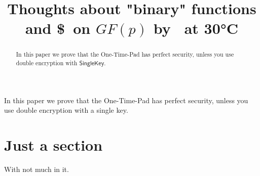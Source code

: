 \documentclass{iacrcc}
\title[running={Thoughts on binary functions},
  subtitle={A story about \niceguy is here},
  plaintext={Thoughts about "binary" functions and \$\ on $GF(p)$ by Fester Bestertester at 30°C}]{%
  Thoughts about "binary" functions and \$\ on $GF(p)$ by \niceguy\ at 30°C}
\begin{document}
\maketitle

\begin{abstract}
  In this paper we prove that the One-Time-Pad has perfect security, unless you use
  double encryption with {$\mathsf{SingleKey}$}.

\end{abstract}
\begin{textabstract}
In this paper we prove that the One-Time-Pad has perfect security, unless you use
double encryption with a single key.
\end{textabstract}
\section{Just a section}
With not much in it.
\end{document}
